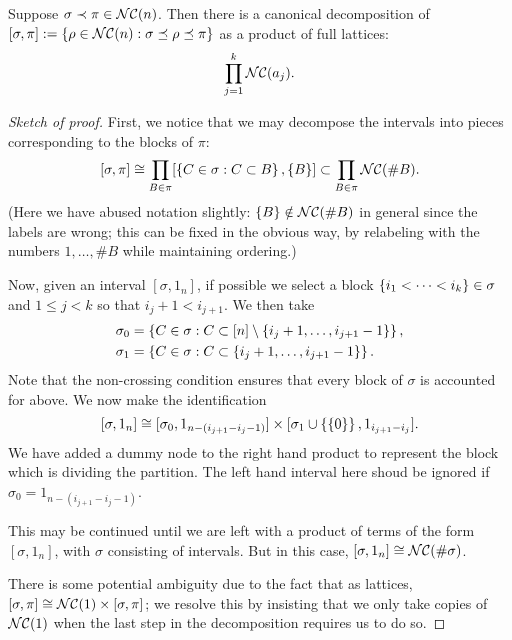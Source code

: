 \begin{proposition}
	\label{prop:ncfactoring}
	Suppose $\sigma\prec\pi \in \mathcal{NC}(n)$.
	Then there is a canonical decomposition of $[\sigma, \pi] := \left\{\rho \in \mathcal{NC}(n) : \sigma\preceq\rho\preceq\pi\right\}$ as a product of full lattices:
$$\prod_{j=1}^k \mathcal{NC}(a_j).$$
\end{proposition}

\begin{proof}[Sketch of proof]
	First, we notice that we may decompose the intervals into pieces corresponding to the blocks of $\pi$:
	$$[\sigma, \pi] \cong \prod_{B\in\pi} [\left\{C \in \sigma : C \subset B\right\}, \left\{B\right\}] \subset \prod_{B\in\pi} \mathcal{NC}(\# B).$$
	(Here we have abused notation slightly: $\left\{B\right\} \notin \mathcal{NC}(\#B)$ in general since the labels are wrong; this can be fixed in the obvious way, by relabeling with the numbers $1, \ldots, \#B$ while maintaining ordering.)

	Now, given an interval $[\sigma, 1_n]$, if possible we select a block $\left\{i_1<\cdots<i_k\right\} \in \sigma$ and $1 \leq j < k$ so that $i_j + 1 < i_{j+1}$.
	We then take
	\begin{align*}
		\sigma_0 &= \left\{C \in \sigma : C \subset [n] \setminus\left\{i_{j}+1, \ldots, i_{j+1}-1\right\}\right\},\\
		\sigma_1 &= \left\{C \in \sigma : C \subset\left\{i_{j}+1, \ldots, i_{j+1}-1\right\}\right\}.
	\end{align*}
	Note that the non-crossing condition ensures that every block of $\sigma$ is accounted for above.
	We now make the identification
	$$[\sigma, 1_n] \cong [\sigma_0, 1_{n-(i_{j+1}-i_j-1)}] \times [\sigma_1 \cup \left\{\left\{0\right\}\right\}, 1_{i_{j+1}-i_j}].$$
	We have added a dummy node to the right hand product to represent the block which is dividing the partition.
	The left hand interval here shoud be ignored if $\sigma_0 = 1_{n-(i_{j+1}-i_j-1)}$.
	
	This may be continued until we are left with a product of terms of the form $[\sigma, 1_n]$, with $\sigma$ consisting of intervals.
	But in this case, $[\sigma, 1_n] \cong \mathcal{NC}(\#\sigma)$.

	There is some potential ambiguity due to the fact that as lattices, $[\sigma, \pi] \cong \mathcal{NC}(1)\times[\sigma, \pi]$; we resolve this by insisting that we only take copies of $\mathcal{NC}(1)$ when the last step in the decomposition requires us to do so.
\end{proof}


